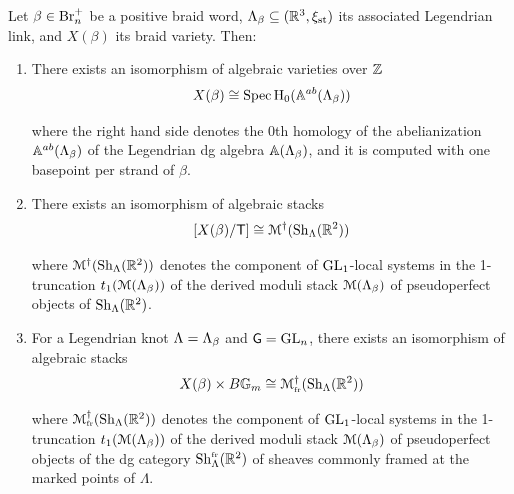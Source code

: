 \begin{theorem}\label{thm:braid_varieties_from_Legendrian}
Let $\beta\in\mbox{Br}_n^+$ be a positive braid word, $\Lambda_\beta\subseteq(\mathbb{R}^3,\xi_{\text{st}})$ its associated Legendrian link, and $X(\beta)$ its braid variety. Then:

\begin{enumerate}[label=$(\roman*)$]
    \item There exists an isomorphism of algebraic varieties over $\mathbb{Z}$
    \begin{equation}\label{eq:braid_variety_dga}
    X(\beta)\cong\operatorname{Spec }\operatorname{H}_0(\mathbb{A}^{ab}(\Lambda_\beta)) 
    \end{equation}
    
    \noindent where the right hand side denotes the $0$th homology of the abelianization $\mathbb{A}^{ab}(\Lambda_\beta)$ of the Legendrian dg algebra $\mathbb{A}(\Lambda_\beta)$, and it is computed with one basepoint per strand of $\beta$.\\

    \item There exists an isomorphism of algebraic stacks
    \begin{equation}\label{eq:braid_variety_sheaf}
        [X(\beta)/\mathsf{T}]\cong \mathcal{M}^{\dagger}(\operatorname{Sh}_\Lambda(\mathbb{R}^2))
    \end{equation}

    \noindent where $\mathcal{M}^{\dagger}(\operatorname{Sh}_\Lambda(\mathbb{R}^2))$ denotes the component of $\operatorname{GL}_1$-local systems in the 1-truncation $t_1(\mathcal{M}(\Lambda_\beta))$ of the derived moduli stack $\mathcal{M}(\Lambda_\beta)$ of pseudoperfect objects of $\operatorname{Sh}_\Lambda(\mathbb{R}^2)$.\\

    \item For a Legendrian knot $\Lambda=\Lambda_\beta$ and $\mathsf{G}=\operatorname{GL}_n$, there exists an isomorphism of algebraic stacks
    \begin{equation}\label{eq:braid_variety_sheaf2}
        X(\beta)\times B\mathbb{G}_m\cong \mathcal{M}^{\dagger}_{\mbox{\tiny fr}}(\operatorname{Sh}_\Lambda(\mathbb{R}^2))
    \end{equation}

    \noindent where $\mathcal{M}^{\dagger}_{\mbox{\tiny fr}}(\operatorname{Sh}_\Lambda(\mathbb{R}^2))$ denotes the component of $\operatorname{GL}_1$-local systems in the 1-truncation $t_1(\mathcal{M}(\Lambda_\beta))$ of the derived moduli stack $\mathcal{M}(\Lambda_\beta)$ of pseudoperfect objects of the dg category $\operatorname{Sh}^{\mbox{\tiny fr}}_\Lambda(\mathbb{R}^2)$ of sheaves commonly framed at the marked points of $\Lambda$.
\sbs
\end{enumerate}
\end{theorem}

